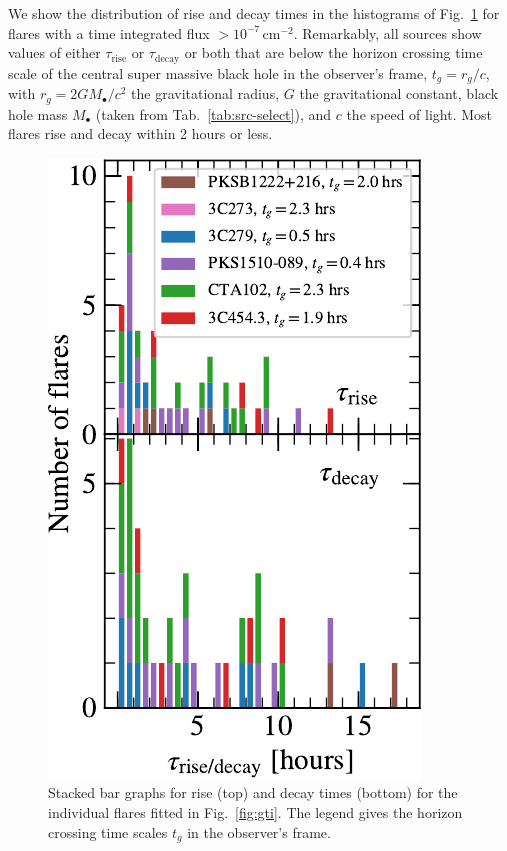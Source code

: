 \documentclass[twocolumn,linenumbers]{aastex62}
\begin{document}
We show the distribution of rise and decay times in the histograms of Fig.~\ref{fig:times-hist} for flares with a time integrated flux $>10^{-7}\,\mathrm{cm}^{-2}$. 
Remarkably, all sources show values of either $\tau_\mathrm{rise}$ or $\tau_\mathrm{decay}$ or both that are below the horizon crossing time scale of the central super massive black hole in the observer's frame, $t_g = r_g / c$, with $r_g = 2 G M_\bullet / c^2 $ the gravitational radius, $G$ the gravitational constant, black hole mass $M_\bullet$ (taken from Tab.~\ref{tab:src-select}), and $c$ the speed of light.
Most flares rise and decay within 2 hours or less. 
\begin{figure}
    \centering
    \includegraphics[width = .8\linewidth]{figures/lcfithop_results_tdtrhist_maxiter2_fsys0p00_addcomp0_orbit.pdf}
    \caption{Stacked bar graphs for  rise (top) and decay times (bottom) for the individual flares fitted in Fig.~\ref{fig:gti}. The legend gives the horizon crossing time scales $t_g$ in the observer's frame.}
    \label{fig:times-hist}
\end{figure}
\end{document}
